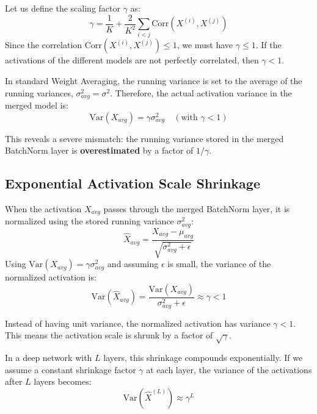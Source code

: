 \documentclass{article}
\theoremstyle{plain}
\theoremstyle{definition}
\theoremstyle{remark}
\begin{document}
Let us define the scaling factor $\gamma$ as:
\begin{equation}
    \gamma = \frac{1}{K} + \frac{2}{K^2} \sum_{i < j} \text{Corr}(X^{(i)}, X^{(j)})
\label{eq:gamma_def}
\end{equation}
Since the correlation $\text{Corr}(X^{(i)}, X^{(j)}) \le 1$, we must have $\gamma \le 1$. If the activations of the different models are not perfectly correlated, then $\gamma < 1$.

In standard Weight Averaging, the running variance is set to the average of the running variances, $\sigma^2_{avg} = \sigma^2$. Therefore, the actual activation variance in the merged model is:
\begin{equation}
    \text{Var}(X_{avg}) = \gamma \sigma^2_{avg} \quad (\text{with } \gamma < 1)
\label{eq:variance_mismatch}
\end{equation}

This reveals a severe mismatch: the running variance stored in the merged BatchNorm layer is \textbf{overestimated} by a factor of $1 / \gamma$.

\subsection{Exponential Activation Scale Shrinkage}

When the activation $X_{avg}$ passes through the merged BatchNorm layer, it is normalized using the stored running variance $\sigma^2_{avg}$:
\begin{equation}
    \hat{X}_{avg} = \frac{X_{avg} - \mu_{avg}}{\sqrt{\sigma^2_{avg} + \epsilon}}
\label{eq:bn_norm}
\end{equation}
Using $\text{Var}(X_{avg}) = \gamma \sigma^2_{avg}$ and assuming $\epsilon$ is small, the variance of the normalized activation is:
\begin{equation}
    \text{Var}(\hat{X}_{avg}) = \frac{\text{Var}(X_{avg})}{\sigma^2_{avg} + \epsilon} \approx \gamma < 1
\label{eq:shrinkage}
\end{equation}

Instead of having unit variance, the normalized activation has variance $\gamma < 1$. This means the activation scale is shrunk by a factor of $\sqrt{\gamma}$.

In a deep network with $L$ layers, this shrinkage compounds exponentially. If we assume a constant shrinkage factor $\gamma$ at each layer, the variance of the activations after $L$ layers becomes:
\begin{equation}
    \text{Var}(\hat{X}^{(L)}) \approx \gamma^L
\label{eq:exponential_shrinkage}
\end{equation}
\end{document}
